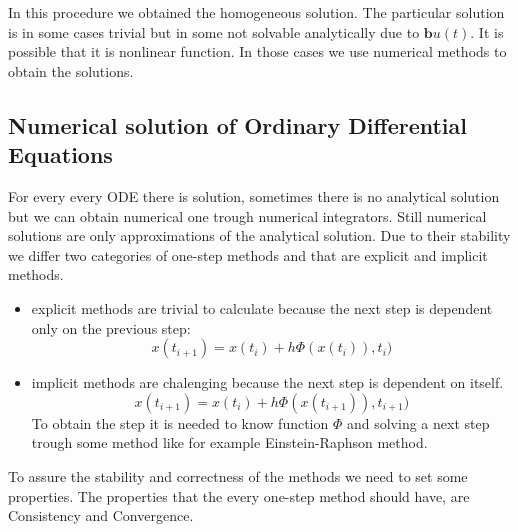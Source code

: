 In this procedure we obtained the homogeneous solution. The particular solution is in some cases trivial but in some not solvable analytically due to $\mathbf{b}u(t)$. It is possible that it is nonlinear function. 
In those cases we use numerical methods to obtain the solutions.

\subsection{Numerical solution of Ordinary Differential Equations}
For every every ODE there is solution, sometimes there is no analytical solution but we can obtain numerical one trough numerical integrators. 
Still numerical solutions are only approximations of the analytical solution. Due to their stability we differ two categories of one-step methods and that are explicit and implicit methods.\\
\begin{itemize}
	\item explicit methods are trivial to calculate because the next step is dependent only on the previous step:
	\begin{equation}
		x(t_{i+1}) = x(t_i) + h\Phi(x(t_i)),t_i)
	\end{equation}
	\item implicit methods are chalenging because the next step is dependent on itself.
	\begin{equation}
		x(t_{i+1}) = x(t_i) + h\Phi(x(t_{i+1})),t_{i+1})
	\end{equation}
To obtain the step it is needed to know  function $\Phi$ and solving a next step trough some method like  for example Einstein-Raphson method. 
\end{itemize}
To assure the stability and correctness of the methods we need to set some properties.
The properties that the every one-step method should have, are Consistency and Convergence.\\

